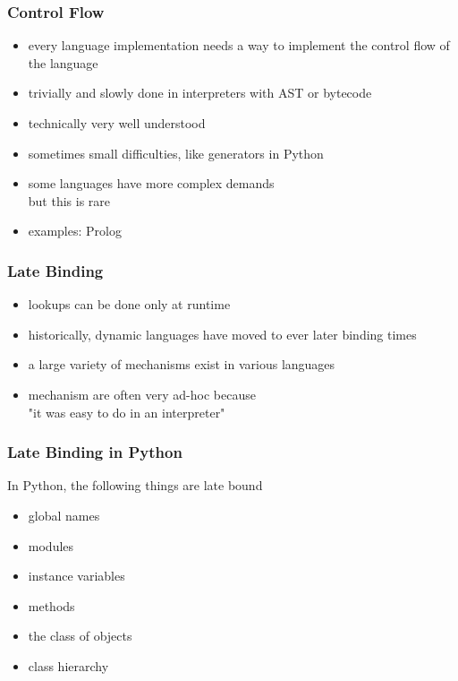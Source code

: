 \documentclass[utf8x]{beamer}
\begin{document}


\begin{frame}
  \frametitle{Control Flow}
    \begin{itemize}
        \item every language implementation needs a way to implement the control flow of the language
        \item trivially and slowly done in interpreters with AST or bytecode
        \item technically very well understood
        \item sometimes small difficulties, like generators in Python
        \pause
        \item some languages have more complex demands\\
        but this is rare
        \item examples: Prolog
    \end{itemize}
\end{frame}

\begin{frame}
  \frametitle{Late Binding}
  \begin{itemize}
      \item lookups can be done only at runtime
      \item historically, dynamic languages have moved to ever later binding times
      \item a large variety of mechanisms exist in various languages
      \item mechanism are often very ad-hoc because \\
      "it was easy to do in an interpreter"
  \end{itemize}
\end{frame}

\begin{frame}
  \frametitle{Late Binding in Python}
  In Python, the following things are late bound
  \begin{itemize}
      \item global names
      \item modules
      \item instance variables
      \item methods
      \pause
      \item the class of objects
      \item class hierarchy
  \end{itemize}
\end{frame}
\end{document}
